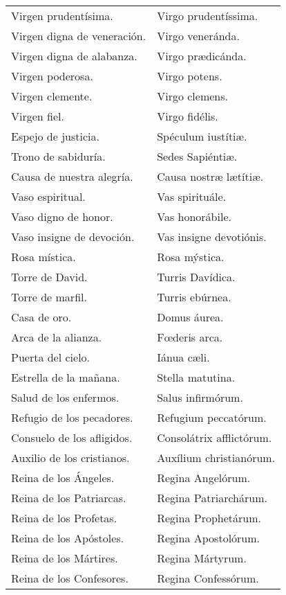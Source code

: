 \documentclass[11pt,a4paper]{book}
\begin{document}
\begin{longtable} { p{} p{} }
        Virgen pru­den­tísima. & Virgo pru­den­tíssima.\\
        Virgen digna de veneración. & Virgo veneránda.\\
        Virgen digna de alabanza. & Virgo prædicánda.\\
        Virgen poderosa. & Virgo potens.\\
        Virgen clemente. & Virgo clemens.\\
        Virgen fiel. & Virgo fidélis.\\
        Espejo de justicia. & Spéculum iustítiæ.\\
        Trono de sabiduría. & Sedes Sapiéntiæ.\\
        Causa de nuestra alegría. & Causa nostræ lætítiæ.\\
        Vaso espiritual. & Vas spirituále.\\
        Vaso digno de honor. & Vas honorábile.\\
        Vaso insigne de devoción. & Vas insigne devotiónis.\\
        Rosa mística. & Rosa mýstica.\\
        Torre de David. & Turris Davídica.\\
        Torre de marfil. & Turris ebúrnea.\\
        Casa de oro. & Domus áurea.\\
        Arca de la alianza. & Fœderis arca.\\
        Puerta del cielo. & Iánua cæli.\\
        Estrella de la mañana. & Stella matutina.\\
        Salud de los enfermos. & Salus infirmórum.\\
        Refugio de los pecadores. & Refugium peccatórum.\\
        Consuelo de los afligidos. & Consolátrix af­flic­tórum.\\
        Auxilio de los cristianos. & Auxílium chris­tia­nórum.\\
        Reina de los Ángeles. & Regina Angelórum.\\
        Reina de los Patriarcas. & Regina Pa­triar­chárum.\\
        Reina de los Profetas. & Regina Pro­phe­tárum.\\
        Reina de los Apóstoles. & Regina Apos­to­lórum.\\
        Reina de los Mártires. & Regina Mártyrum.\\
        Reina de los Confesores. & Regina Con­fe­ssórum.\\

\end{longtable}
\end{document}
